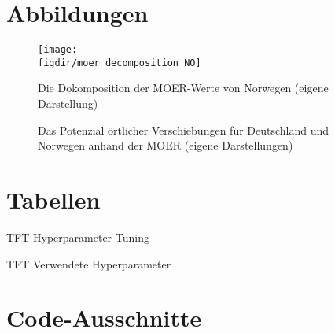 \chapter{Abbildungen}
\begin{figure}
    \caption{Die Dokomposition der MOER-Werte von Norwegen (eigene Darstellung)}
    {\texttt{[image: \\figdir/moer\_decomposition\_NO]}}
    \label{FIG:moer_decomposition_NO}
\end{figure}

\begin{figure}
    \centering
    \qquad
    \qquad
    \caption{Das Potenzial örtlicher Verschiebungen für Deutschland und Norwegen anhand der MOER (eigene Darstellungen)}%
    \label{FIG:location-shifting-potential}%
\end{figure}


\chapter{Tabellen}
\begin{table}[t]
    \centering\small
    \caption{TFT Hyperparameter Tuning}
    \label{TAB:hyperparameter-trained}
    
\end{table}

\begin{table}[t]
    \centering\small
    \caption{TFT Verwendete Hyperparameter}
    \label{TAB:hyperparameter-used}
    
\end{table}


\chapter{Code-Ausschnitte}

